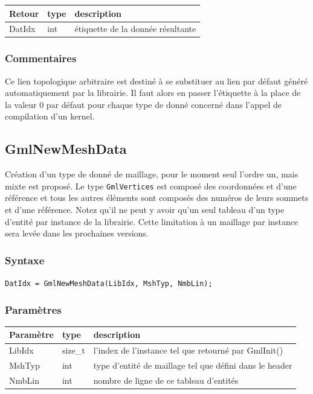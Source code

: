 \documentclass[a4paper,12pt]{article}
\begin{document}
\medskip

\begin{tabular}{|m{2cm}|m{1.5cm}|m{10.5cm}|}
\hline
Retour     & type   & description \\
\hline
DatIdx     & int    & étiquette de la donnée résultante \\
\hline
\end{tabular}

\subsubsection*{Commentaires}
Ce lien topologique arbitraire est destiné à se substituer au lien par défaut généré automatiquement par la librairie.
Il faut alors en passer l'étiquette à la place de la valeur 0 par défaut pour chaque type de donné concerné dans l'appel de compilation d'un kernel.


\subsection{GmlNewMeshData}

Création d'un type de donné de maillage, pour le moment seul l'ordre un, mais mixte est proposé.
Le type {\tt GmlVertices} est composé des coordonnées et d'une référence et tous les autres éléments sont composés des numéros de leurs sommets et d'une référence.
Notez qu'il ne peut y avoir qu'un seul tableau d'un type d'entité par instance de la librairie.
Cette limitation à un maillage par instance sera levée dans les prochaines versions.

\subsubsection*{Syntaxe}

{\tt DatIdx = GmlNewMeshData(LibIdx, MshTyp, NmbLin);}

\subsubsection*{Paramètres}

\begin{tabular}{|m{2cm}|m{1.5cm}|m{10.5cm}|}
\hline
Paramètre  & type    & description \\
\hline
LibIdx     & size\_t & l'index de l'instance tel que retourné par GmlInit() \\
\hline
MshTyp     & int     & type d'entité de maillage tel que défini dans le header \\
\hline
NmbLin     & int     & nombre de ligne de ce tableau d'entités \\
\hline
\end{tabular}
\end{document}
